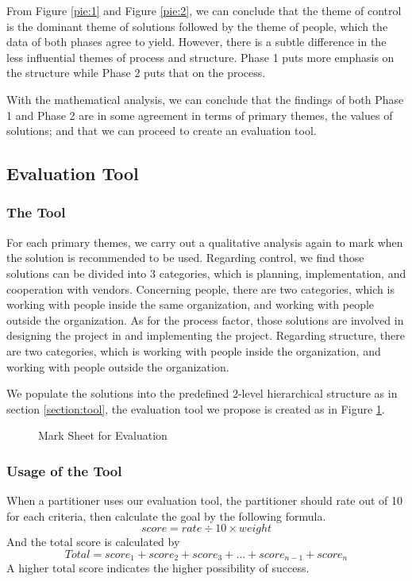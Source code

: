 From Figure \ref{pie:1} and Figure \ref{pie:2}, we can conclude that the theme of control is the dominant theme of solutions followed by the theme of people, which the data of both phases agree to yield. However, there is a subtle difference in the less influential themes of process and structure. Phase 1 puts more emphasis on the structure while Phase 2 puts that on the process.

With the mathematical analysis, we can conclude that the findings of both Phase 1 and Phase 2 are in some agreement in terms of primary themes, the values of solutions; and that we can proceed to create an evaluation tool.

\subsection{Evaluation Tool}

\subsubsection{The Tool}

For each primary themes, we carry out a qualitative analysis again to mark when the solution is recommended to be used. Regarding control, we find those solutions can be divided into 3 categories, which is planning, implementation, and cooperation with vendors. Concerning people, there are two categories, which is working with people inside the same organization,  and working with people outside the organization. As for the process factor, those solutions are involved in designing the project in and implementing the project. Regarding structure,  there are two categories, which is working with people inside the organization, and working with people outside the organization.

We populate the solutions into the predefined 2-level hierarchical structure as in section \ref{section:tool}, the evaluation tool we propose is created as in Figure \ref{table:tool}.

\begin{figure}[ht]
\centering
\caption{Mark Sheet for Evaluation}
\label{table:tool}
\end{figure}
\subsubsection{Usage of the Tool}

When a partitioner uses our evaluation tool, the partitioner should rate out of 10 for each criteria, then calculate the goal by the following formula.
$$
score = rate \div 10 \times weight
$$
And the total score is calculated by
$$
Total = score_1 + score_2 + score_3 + \ldots + score_{n-1} + score_n
$$
A higher total score indicates the higher possibility of success.
